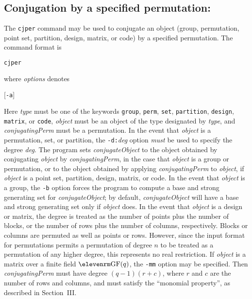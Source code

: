 \subsection{Conjugation by a specified permutation:}The {\tt cjper}
command may be used to conjugate an object (group, permutation, point set,
partition, design, matrix, or code) by a specified permutation.  The command
format is
%
\smallskip
\centerline{{\tt cjper}}
\smallskip
where {\it options\/} denotes
\smallskip
\centerline{
            [{\tt -a}]\enskip
            [{\tt -b}]\enskip
            [{\tt -d:}{\it deg\/}]\enskip
            [{\tt -i}]\enskip
            [{\tt -mb:}$k$]\enskip
            [{\tt -mm}]\enskip
            [{\tt -mw:}$w$]\enskip
            [{\tt -n:}{\it name\/}]\enskip
            [{\tt -p:}{\it path\/}]\enskip
            [{\tt -q}]\enskip}
\smallskip
Here {\it type\/} must be one of the keywords {\tt group}, {\tt perm},
{\tt set}, {\tt partition}, {\tt design}, {\tt matrix}, or {\tt code},\enskip
{\it object\/} must be an object of the type designated by {\it type},\enskip
and {\it conjugatingPerm\/} must be a permutation.  In the event that {\it object\/}
is a permutation, set, or partition, the {\tt -d:}{\it deg} option {\it must\/}
be used to specify the degree {\it deg}.  The program sets
{\it conjugateObject\/} to the object obtained by conjugating {\it object\/}
by {\it conjugatingPerm\/}, in the case that {\it object\/} is a group 
or permutation, or to the object obtained by
applying {\it conjugatingPerm\/} to {\it object}, if {\it object} is a
point set, partition, design, matrix, or code.  In the event that
{\it object\/} is a group, the {\tt -b} option forces the program to
compute a base and strong generating set for {\it conjugateObject\/}; by
default, {\it conjugateObject\/} will have a base and strong generating
set only if {\it object\/} does.
\medbreak
In the event that {\it object\/} is a design or matrix, the degree
is treated as the number of points plus the number of blocks, or the
number of rows plus the number of columns, respectively.
Blocks or columns are permuted as well as points or rows.  However,
since the input format for permutations permits a permutation of degree $n$
to be treated as a permutation of any higher degree, this represents no
real restriction.
\medbreak
If {\it object\/} is a matrix over a finite field ${\rm GF}(q)$, the {\tt -mm}
option may be specified.  Then {\it conjugatingPerm\/} must have degree
$(q-1)(r+c)$, where $r$ and $c$ are the number of rows and columns, and
must satisfy the ``monomial property'', as described in Section~III.

